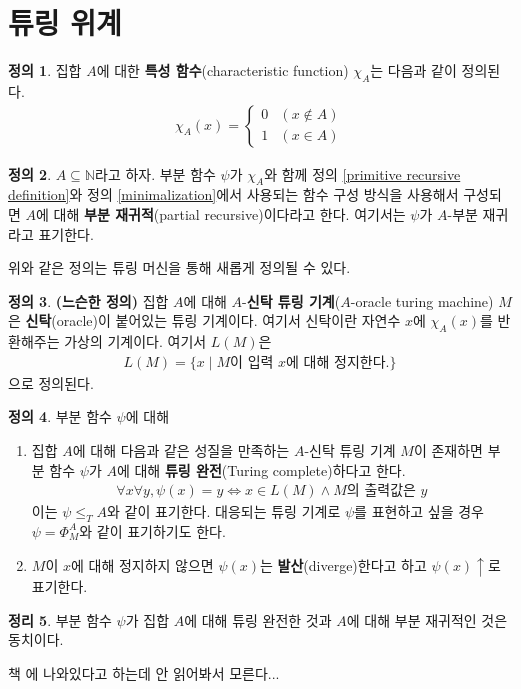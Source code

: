 \documentclass[b5paper, 10pt]{book}
\theoremstyle{definition}
\newtheorem{defn}{정의}[chapter]
\newtheorem{thm}[defn]{정리}
\newenvironment{pf*}{\pushQED{\qed}\pf}{\popQED\endpf}
\begin{document}
\section{튜링 위계}
\begin{defn}
    집합 $A$에 대한 \textbf{특성 함수}(characteristic function) $\chi_A$는 다음과 같이 정의된다.
    \begin{align*}
        \chi_A(x) = 
        \begin{cases}
            0 & (x \notin A) \\ 
            1 & (x \in A)
        \end{cases}
    \end{align*}
\end{defn}
\begin{defn}
    $A \subseteq \mathbb{N}$라고 하자. 부분 함수 $\psi$가 
    $\chi_A$와 함께
    정의 \ref{primitive recursive definition}와 
    정의 \ref{minimalization}에서 사용되는 함수 구성 방식을 사용해서 구성되면 $A$에 대해 
    \textbf{부분 재귀적}(partial recursive)이다라고 한다. 여기서는 $\psi$가 $A$-부분 재귀라고 표기한다. 
\end{defn}
위와 같은 정의는 튜링 머신을 통해 새롭게 정의될 수 있다.
\begin{defn}
    \textbf{(느슨한 정의)} 집합 $A$에 대해 $A$-\textbf{신탁 튜링 기계}($A$-oracle turing machine) $M$은
    \textbf{신탁}(oracle)이 붙어있는 튜링 기계이다.
    여기서 신탁이란 자연수 $x$에 $\chi_A(x)$를 반환해주는
    가상의 기계이다. 여기서 $L(M)$은 
    \begin{align*}
        L(M) = \{x \;\vert\; M\text{이 입력 } x\text{에 대해 정지한다.} \}
    \end{align*}
    으로 정의된다.
\end{defn}
\begin{defn}
    부분 함수 $\psi$에 대해
    \begin{enumerate}
        \item 집합 $A$에 대해 다음과 같은 성질을 만족하는 
        $A$-신탁 튜링 기계 $M$이 존재하면 부분 함수 $\psi$가 
        $A$에 대해 \textbf{튜링 완전}(Turing complete)하다고 한다.
        \begin{align*}
            \forall x \forall y,  \psi(x) = y \Leftrightarrow 
            x \in L(M) \wedge M\text{의 출력값은 } y
        \end{align*} 
        이는 $\psi \le_T A$와 같이 표기한다. 대응되는 튜링 기계로 $\psi$를 표현하고 싶을 경우
        $\psi = \Phi_M^A$와 같이 표기하기도 한다. 
        \item $M$이 $x$에 대해 정지하지 않으면 $\psi(x)$는 \textbf{발산}(diverge)한다고 하고
        $\psi(x) \uparrow$로 표기한다.
    \end{enumerate}
\end{defn}
\begin{thm}
    부분 함수 $\psi$가 집합 $A$에 대해 튜링 완전한 것과 $A$에 대해 부분 재귀적인 것은 동치이다.
\end{thm}
\begin{pf*}
    책 \cite{kleene1952introduction}에 나와있다고 하는데 안 읽어봐서 모른다...
\end{pf*}
\end{document}
